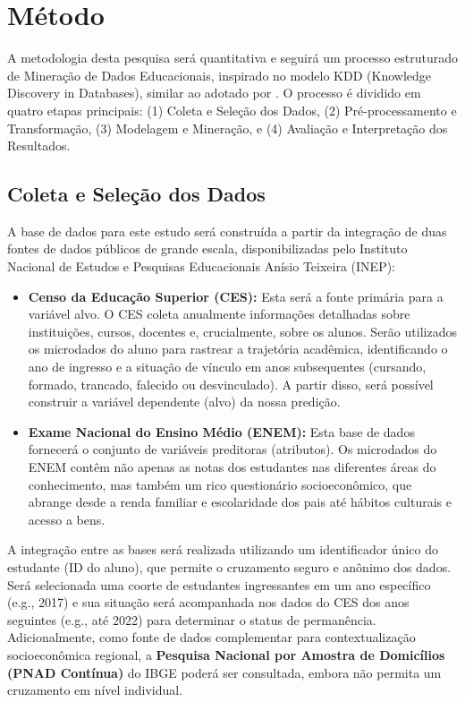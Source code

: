 \documentclass[english, brazilian]{RBIEarticle}
\begin{document}
\section{Método}
A metodologia desta pesquisa será quantitativa e seguirá um processo estruturado de Mineração de Dados Educacionais, inspirado no modelo KDD (Knowledge Discovery in Databases), similar ao adotado por \textcite{Souza2021}. O processo é dividido em quatro etapas principais: (1) Coleta e Seleção dos Dados, (2) Pré-processamento e Transformação, (3) Modelagem e Mineração, e (4) Avaliação e Interpretação dos Resultados.

\subsection{Coleta e Seleção dos Dados}
A base de dados para este estudo será construída a partir da integração de duas fontes de dados públicos de grande escala, disponibilizadas pelo Instituto Nacional de Estudos e Pesquisas Educacionais Anísio Teixeira (INEP):
\begin{itemize}
    \item \textbf{Censo da Educação Superior (CES):} Esta será a fonte primária para a variável alvo. O CES coleta anualmente informações detalhadas sobre instituições, cursos, docentes e, crucialmente, sobre os alunos. Serão utilizados os microdados do aluno para rastrear a trajetória acadêmica, identificando o ano de ingresso e a situação de vínculo em anos subsequentes (cursando, formado, trancado, falecido ou desvinculado). A partir disso, será possível construir a variável dependente (alvo) da nossa predição.
    \item \textbf{Exame Nacional do Ensino Médio (ENEM):} Esta base de dados fornecerá o conjunto de variáveis preditoras (atributos). Os microdados do ENEM contêm não apenas as notas dos estudantes nas diferentes áreas do conhecimento, mas também um rico questionário socioeconômico, que abrange desde a renda familiar e escolaridade dos pais até hábitos culturais e acesso a bens.
\end{itemize}
A integração entre as bases será realizada utilizando um identificador único do estudante (ID do aluno), que permite o cruzamento seguro e anônimo dos dados. Será selecionada uma coorte de estudantes ingressantes em um ano específico (e.g., 2017) e sua situação será acompanhada nos dados do CES dos anos seguintes (e.g., até 2022) para determinar o status de permanência. Adicionalmente, como fonte de dados complementar para contextualização socioeconômica regional, a \textbf{Pesquisa Nacional por Amostra de Domicílios (PNAD Contínua)} do IBGE poderá ser consultada, embora não permita um cruzamento em nível individual.
\end{document}
